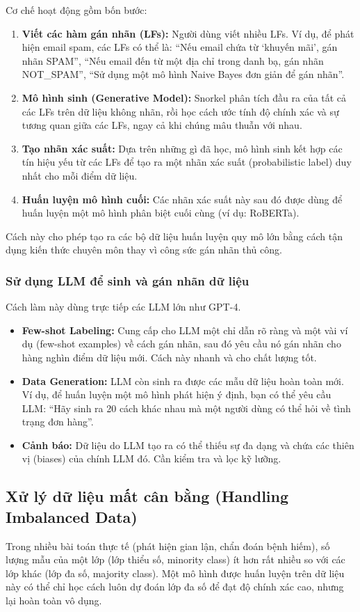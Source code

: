 Cơ chế hoạt động gồm bốn bước:
\begin{enumerate}
    \item \textbf{Viết các hàm gán nhãn (LFs):} Người dùng viết nhiều LFs. Ví dụ, để phát hiện email spam, các LFs có thể là: “Nếu email chứa từ ‘khuyến mãi’, gán nhãn SPAM”, “Nếu email đến từ một địa chỉ trong danh bạ, gán nhãn NOT\_SPAM”, “Sử dụng một mô hình Naive Bayes đơn giản để gán nhãn”.
    \item \textbf{Mô hình sinh (Generative Model):} Snorkel phân tích đầu ra của tất cả các LFs trên dữ liệu không nhãn, rồi học cách ước tính độ chính xác và sự tương quan giữa các LFs, ngay cả khi chúng mâu thuẫn với nhau.
    \item \textbf{Tạo nhãn xác suất:} Dựa trên những gì đã học, mô hình sinh kết hợp các tín hiệu yếu từ các LFs để tạo ra một nhãn xác suất (probabilistic label) duy nhất cho mỗi điểm dữ liệu.
    \item \textbf{Huấn luyện mô hình cuối:} Các nhãn xác suất này sau đó được dùng để huấn luyện một mô hình phân biệt cuối cùng (ví dụ: RoBERTa).
\end{enumerate}

Cách này cho phép tạo ra các bộ dữ liệu huấn luyện quy mô lớn bằng cách tận dụng kiến thức chuyên môn thay vì công sức gán nhãn thủ công.

\subsubsection{Sử dụng LLM để sinh và gán nhãn dữ liệu}
Cách làm này dùng trực tiếp các LLM lớn như GPT-4.
\begin{itemize}
    \item \textbf{Few-shot Labeling:} Cung cấp cho LLM một chỉ dẫn rõ ràng và một vài ví dụ (few-shot examples) về cách gán nhãn, sau đó yêu cầu nó gán nhãn cho hàng nghìn điểm dữ liệu mới. Cách này nhanh và cho chất lượng tốt.
    \item \textbf{Data Generation:} LLM còn sinh ra được các mẫu dữ liệu hoàn toàn mới. Ví dụ, để huấn luyện một mô hình phát hiện ý định, bạn có thể yêu cầu LLM: “Hãy sinh ra 20 cách khác nhau mà một người dùng có thể hỏi về tình trạng đơn hàng”.
    \item \textbf{Cảnh báo:} Dữ liệu do LLM tạo ra có thể thiếu sự đa dạng và chứa các thiên vị (biases) của chính LLM đó. Cần kiểm tra và lọc kỹ lưỡng.
\end{itemize}

\subsection{Xử lý dữ liệu mất cân bằng (Handling Imbalanced Data)}
\label{ssec:imbalanced_data}
Trong nhiều bài toán thực tế (phát hiện gian lận, chẩn đoán bệnh hiếm), số lượng mẫu của một lớp (lớp thiểu số, minority class) ít hơn rất nhiều so với các lớp khác (lớp đa số, majority class). Một mô hình được huấn luyện trên dữ liệu này có thể chỉ học cách luôn dự đoán lớp đa số để đạt độ chính xác cao, nhưng lại hoàn toàn vô dụng.

